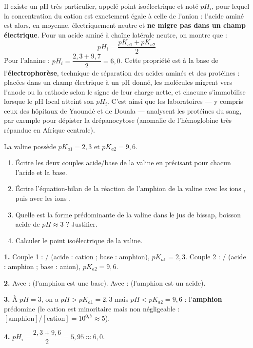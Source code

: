 \documentclass[11pt]{article}
\newcommand{\cle}[1]{{\popxbold\color{popdark}#1}}
\begin{document}
\begin{savaistu}
Il existe un pH très particulier, appelé \cle{point isoélectrique} et noté $pH_i$, pour lequel la concentration du cation est exactement égale à celle de l'anion : l'acide aminé est alors, en moyenne, électriquement neutre et \textbf{ne migre pas dans un champ électrique}. Pour un acide aminé à chaîne latérale neutre, on montre que :
\[ pH_i = \frac{pK_{a1} + pK_{a2}}{2} \]
Pour l'alanine : $pH_i = \dfrac{2{,}3 + 9{,}7}{2} = 6{,}0$. Cette propriété est à la base de l'\textbf{électrophorèse}, technique de séparation des acides aminés et des protéines : placées dans un champ électrique à un pH donné, les molécules migrent vers l'anode ou la cathode selon le signe de leur charge nette, et chacune s'immobilise lorsque le pH local atteint son $pH_i$. C'est ainsi que les laboratoires — y compris ceux des hôpitaux de Yaoundé et de Douala — analysent les protéines du sang, par exemple pour dépister la drépanocytose (anomalie de l'hémoglobine très répandue en Afrique centrale).
\end{savaistu}

\begin{exercice}
La valine possède $pK_{a1} = 2{,}3$ et $pK_{a2} = 9{,}6$.
\begin{enumerate}
\item Écrire les deux couples acide/base de la valine en précisant pour chacun l'acide et la base.
\item Écrire l'équation-bilan de la réaction de l'amphion de la valine avec les ions , puis avec les ions .
\item Quelle est la forme prédominante de la valine dans le jus de bissap, boisson acide de $pH \approx 3$ ? Justifier.
\item Calculer le point isoélectrique de la valine.
\end{enumerate}
\end{exercice}

\begin{corrige}
\textbf{1.} Couple 1 : / (acide : cation ; base : amphion), $pK_{a1} = 2{,}3$. Couple 2 : / (acide : amphion ; base : anion), $pK_{a2} = 9{,}6$.

\textbf{2.} Avec  :  (l'amphion est une base). Avec  :  (l'amphion est un acide).

\textbf{3.} À $pH = 3$, on a $pH > pK_{a1} = 2{,}3$ mais $pH < pK_{a2} = 9{,}6$ : l'\textbf{amphion} prédomine (le cation est minoritaire mais non négligeable : $[\text{amphion}]/[\text{cation}] = 10^{0{,}7} \approx 5$).

\textbf{4.} $pH_i = \dfrac{2{,}3 + 9{,}6}{2} = 5{,}95 \approx 6{,}0$.
\end{corrige}
\end{document}
